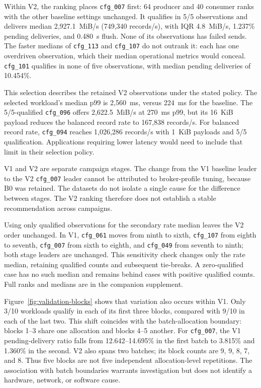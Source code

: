 \documentclass[10pt]{article}
\begin{document}
Within V2, the ranking places \texttt{cfg\_007} first: 64 producer and
40 consumer ranks with the other baseline settings unchanged. It qualifies in
5/5 observations and delivers median 2,927.1~MiB/s (749,340 records/s), with
IQR 4.8~MiB/s, 1.237\% pending deliveries, and 0.480~s flush.
None of its observations has failed sends. The faster medians of
\texttt{cfg\_113} and \texttt{cfg\_107} do not outrank it: each has one
overdriven observation, which their median operational metrics would conceal.
\texttt{cfg\_101} qualifies in none of five observations, with median pending
deliveries of 10.454\%.

This selection describes the retained V2 observations under the stated policy. The selected
workload's median p99 is 2,560~ms, versus 224~ms for the baseline.
The 5/5-qualified \texttt{cfg\_096} offers 2,622.5~MiB/s at 270~ms p99,
but its 16~KiB payload reduces the balanced record rate to 167,838 records/s.
For balanced record rate, \texttt{cfg\_094} reaches 1,026,286 records/s with
1~KiB payloads and 5/5 qualification. Applications requiring lower latency
would need to include that limit in their selection policy.

V1 and V2 are separate campaign stages. The change from the V1 baseline
leader to the V2 \texttt{cfg\_007} leader cannot be attributed to broker-profile
tuning, because B0 was retained. The datasets do not isolate a single cause
for the difference between stages.  The V2 ranking therefore does not establish
a stable recommendation across campaigns.

Using only qualified observations for the secondary rate median leaves the
V2 order unchanged. In V1, \texttt{cfg\_061} moves from ninth to sixth,
\texttt{cfg\_107} from eighth to seventh, \texttt{cfg\_007} from sixth to eighth,
and \texttt{cfg\_049} from seventh to ninth; both stage leaders are unchanged.
This sensitivity check changes only the rate median, retaining qualified counts
and subsequent tie-breaks. A zero-qualified case has no such median and remains
behind cases with positive qualified counts. Full ranks and medians are in the
companion supplement.

Figure~\ref{fig:validation-blocks} shows that variation also occurs within V1.
Only 3/10 workloads qualify in each of its first three blocks, compared with
9/10 in each of the last two.  This shift coincides with the batch-allocation
boundary: blocks 1--3 share one allocation and blocks 4--5 another.
For \texttt{cfg\_007}, the V1 pending-delivery ratio falls from
12.642--14.695\% in the first batch to 3.815\% and 1.360\% in the second.
V2 also spans two batches; its block counts are 9, 9, 8, 7, and 8.
Thus five blocks are not five independent allocation-level repetitions.
The association with batch boundaries warrants investigation but does not
identify a hardware, network, or software cause.
\end{document}
